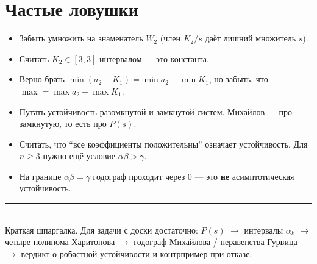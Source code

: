 \documentclass[11pt,a4paper]{article}
\begin{document}
\section{Частые ловушки}

\begin{itemize}
  \item Забыть умножить на знаменатель \(W_2\) (член \(K_2/s\) даёт лишний множитель \(s\)).
  \item Считать \(K_2\in[3,3]\) интервалом --- это константа.
  \item Верно брать \(\min(a_2+K_1)=\min a_2+\min K_1\), но забыть, что
        \(\max=\max a_2+\max K_1\).
  \item Путать устойчивость разомкнутой и замкнутой систем.
        Михайлов --- про замкнутую, то есть про \(P(s)\).
  \item Считать, что ``все коэффициенты положительны'' означает устойчивость.
        Для \(n\ge 3\) нужно ещё условие \(\alpha\beta>\gamma\).
  \item На границе \(\alpha\beta=\gamma\) годограф проходит через \(0\) ---
        это \textbf{не} асимптотическая устойчивость.
\end{itemize}

\vspace{1.2em}
\noindent\textcolor{ruleblue}{\rule{\textwidth}{0.6pt}}\\[0.4em]
{\small\color{rulegray}
Краткая шпаргалка. Для задачи с доски достаточно: \(P(s)\) \(\to\) интервалы \(\alpha_k\) \(\to\)
четыре полинома Харитонова \(\to\) годограф Михайлова / неравенства Гурвица \(\to\)
вердикт о робастной устойчивости и контрпример при отказе.}
\end{document}
